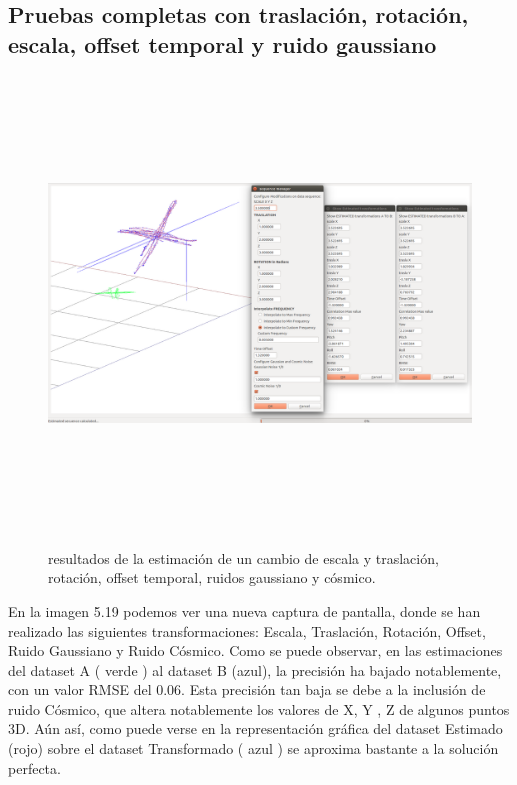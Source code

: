 \subsection{Pruebas completas con traslación, rotación, escala, offset temporal y ruido gaussiano}
\begin{figure}[h]
\begin{center}
\label{fig:opciones de View}\includegraphics[height=12.0cm,width=18.0cm]{img/cap6/Escala_Trasla_Rota_Offset_Gauss_CosmicNoise_abba.png}
\hspace{0.5cm}

\end{center}

\caption{ resultados de la estimación de un cambio de escala y traslación, rotación, offset temporal, ruidos gaussiano y cósmico.}
\end{figure}

En la imagen 5.19 podemos ver una nueva captura de pantalla, donde se han realizado las siguientes transformaciones: Escala, Traslación, Rotación, Offset, Ruido Gaussiano y Ruido Cósmico.
Como se puede observar, en las estimaciones del dataset A ( verde ) al dataset B (azul), la precisión ha bajado notablemente, con un valor RMSE del 0.06.
Esta precisión tan baja se debe a la inclusión de ruido Cósmico, que altera notablemente los valores de X, Y , Z  de algunos puntos 3D.
Aún así, como puede verse en  la representación gráfica del dataset Estimado (rojo) sobre el dataset Transformado ( azul ) se aproxima bastante a la solución perfecta.



